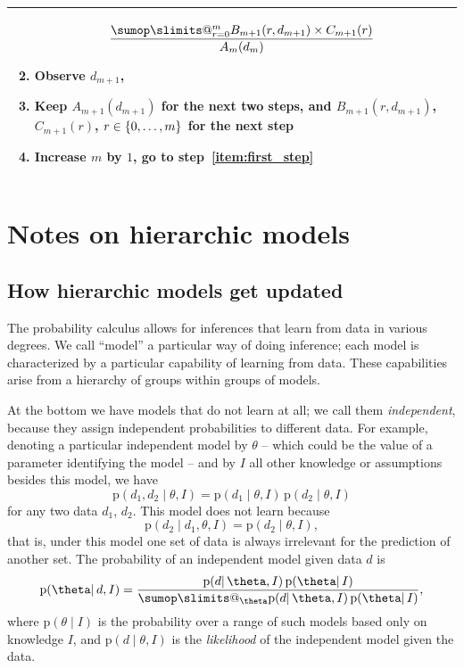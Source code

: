 \documentclass[\ifafour a4paper,12pt,\else a5paper,10pt,\fi%
onecolumn,oneside,article,%
british%
]{memoir}
\makeatletter
\theoremstyle{remark}
\theoremstyle{innote}
\def\sum{\DOTSI\sumop\slimits@}
\DeclarePairedDelimiter\set{\{}{\}}
\newcommand*{\pf}{\mathrm{p}}%
\renewcommand*{\|}{\mathpunct{|}}
\newcommand*{\yth}{\theta}
\newcommand*{\yI}{I}
\makeatother
\begin{document}
\begin{table}[!b]
\begin{tabularx}{\textwidth}{X}
\begin{enumerate}
\[\begin{multlined}[][0.85\textwidth]
    \frac{\sum_{r=0}^{m} B_{m+1}(r,d_{m+1}) \times
      C_{m+1}(r)}{A_{m}(d_{m})}
  \end{multlined}
\]
\item Observe $d_{m+1}$, 
\item Keep $A_{m+1}(d_{m+1})$ for the next two steps, and
  $B_{m+1}(r,d_{m+1})$, $C_{m+1}(r)$, $r\in\set{0,\dotsc,m}$ for the next step
\item Increase $m$ by $1$, go to step~\ref{item:first_step}
  \end{enumerate}
  \\\hline
\end{tabularx}
\end{table}

\clearpage

\section{Notes on hierarchic models}
\label{sec:notes_hierarchic}

\subsection{How hierarchic models get updated}
\label{sec:hierarchic_models}

The probability calculus allows for inferences that learn from data in
various degrees. We call \enquote{model} a particular way of doing
inference; each model is characterized by a particular capability of
learning from data. These capabilities arise from a hierarchy of groups
within groups of models.

At the bottom we have models that do not learn at all; we call them
\emph{independent}, because they assign independent probabilities to
different data. For example, denoting a particular independent model by
$\yth$ -- which could be the value of a parameter identifying the model --
and by $\yI$ all other knowledge or assumptions besides this model, we have
\begin{equation}
  \label{eq:indep_model}
  \pf(d_1,d_2 \| \yth, \yI) = \pf(d_1 \|\yth,\yI) \, \pf(d_2 \|\yth,\yI)
\end{equation}
for any two data $d_1$, $d_2$. This model does not learn because
\begin{equation}
  \label{eq:indep_model_nolearn}
  \pf(d_2\| d_1, \yth, \yI) = \pf(d_2 \|\yth,\yI),
\end{equation}
that is, under this model one set of data is always irrelevant for the
prediction of another set. The probability of an independent model given
data $d$ is
\begin{equation}
  \label{eq:prob_indep_model}
  \pf(\yth \| d, \yI)
  = \frac{
    \pf(d \|\yth,\yI) \, \pf(\yth \| \yI)
  }{
    \sum_{\yth}\pf(d \|\yth,\yI) \, \pf(\yth \| \yI)
  },
\end{equation}
where $\pf(\yth \|\yI)$ is the probability over a range of such models
based only on knowledge $\yI$, and $\pf(d \|\yth,\yI)$ is the
\emph{likelihood} of the independent model given the data.
\end{document}
